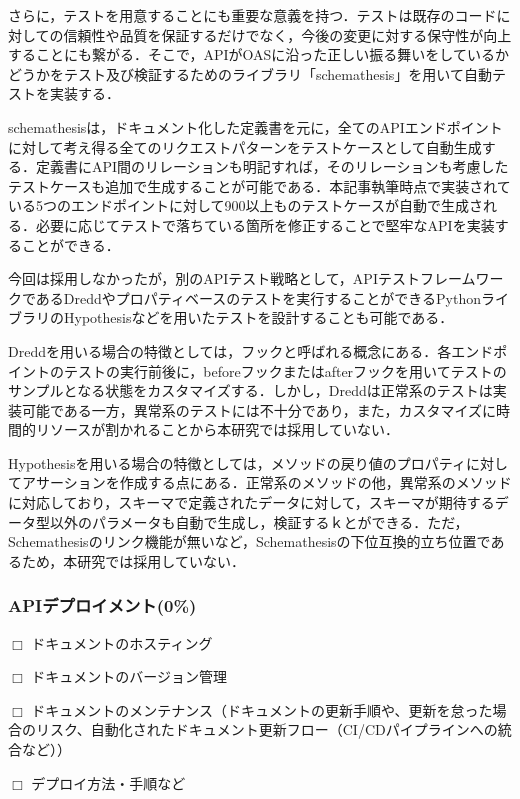           \par さらに，テストを用意することにも重要な意義を持つ．テストは既存のコードに対しての信頼性や品質を保証するだけでなく，今後の変更に対する保守性が向上することにも繋がる．そこで，APIがOASに沿った正しい振る舞いをしているかどうかをテスト及び検証するためのライブラリ「schemathesis」を用いて自動テストを実装する．
          \par schemathesisは，ドキュメント化した定義書を元に，全てのAPIエンドポイントに対して考え得る全てのリクエストパターンをテストケースとして自動生成する．定義書にAPI間のリレーションも明記すれば，そのリレーションも考慮したテストケースも追加で生成することが可能である．本記事執筆時点で実装されている5つのエンドポイントに対して900以上ものテストケースが自動で生成される．必要に応じてテストで落ちている箇所を修正することで堅牢なAPIを実装することができる．
          \par 今回は採用しなかったが，別のAPIテスト戦略として，APIテストフレームワークであるDreddやプロパティベースのテストを実行することができるPythonライブラリのHypothesisなどを用いたテストを設計することも可能である．
          \par Dreddを用いる場合の特徴としては，フックと呼ばれる概念にある．各エンドポイントのテストの実行前後に，beforeフックまたはafterフックを用いてテストのサンプルとなる状態をカスタマイズする．しかし，Dreddは正常系のテストは実装可能である一方，異常系のテストには不十分であり，また，カスタマイズに時間的リソースが割かれることから本研究では採用していない．
          \par Hypothesisを用いる場合の特徴としては，メソッドの戻り値のプロパティに対してアサーションを作成する点にある．正常系のメソッドの他，異常系のメソッドに対応しており，スキーマで定義されたデータに対して，スキーマが期待するデータ型以外のパラメータも自動で生成し，検証するｋとができる．ただ，Schemathesisのリンク機能が無いなど，Schemathesisの下位互換的立ち位置であるため，本研究では採用していない．

      \subsubsection{APIデプロイメント(0\%)}
        \label{sec:APIデプロイメント}
          \par $\Box$ ドキュメントのホスティング
          \par $\Box$ ドキュメントのバージョン管理
          \par $\Box$ ドキュメントのメンテナンス（ドキュメントの更新手順や、更新を怠った場合のリスク、自動化されたドキュメント更新フロー（CI/CDパイプラインへの統合など））
          \par $\Box$ デプロイ方法・手順など


